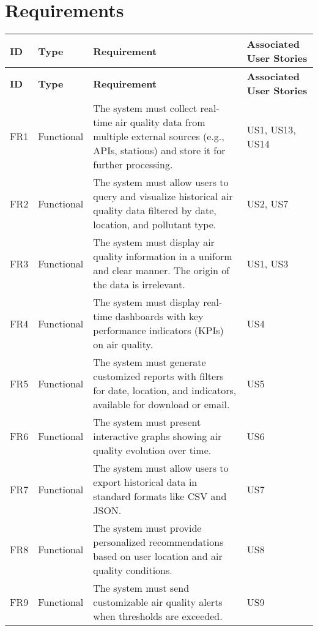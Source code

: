 \section{Requirements}

\begin{longtable}{|p{2cm}|p{2cm}|p{8cm}|p{3cm}|}
\hline
\textbf{ID} & \textbf{Type} & \textbf{Requirement} & \textbf{Associated User Stories} \\
\hline
\endfirsthead

\hline
\textbf{ID} & \textbf{Type} & \textbf{Requirement} & \textbf{Associated User Stories} \\
\hline
\endhead

FR1 & Functional & The system must collect real-time air quality data from multiple external sources (e.g., APIs, stations) and store it for further processing. & US1, US13, US14 \\ 
\hline

FR2 & Functional & The system must allow users to query and visualize historical air quality data filtered by date, location, and pollutant type. & US2, US7 \\ 
\hline

FR3 & Functional & The system must display air quality information in a uniform and clear manner. The origin of the data is irrelevant. & US1, US3 \\ 
\hline

FR4 & Functional & The system must display real-time dashboards with key performance indicators (KPIs) on air quality. & US4 \\ 
\hline

FR5 & Functional & The system must generate customized reports with filters for date, location, and indicators, available for download or email. & US5 \\ 
\hline

FR6 & Functional & The system must present interactive graphs showing air quality evolution over time. & US6 \\ 
\hline

FR7 & Functional & The system must allow users to export historical data in standard formats like CSV and JSON. & US7 \\ 
\hline

FR8 & Functional & The system must provide personalized recommendations based on user location and air quality conditions. & US8 \\ 
\hline

FR9 & Functional & The system must send customizable air quality alerts when thresholds are exceeded. & US9 \\ 
\hline


\end{longtable}
